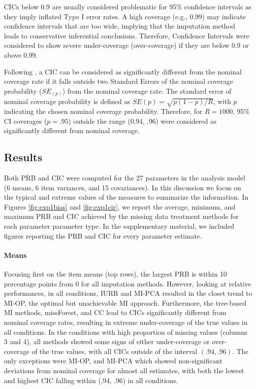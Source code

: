 	CICs below 0.9 are usually considered problematic for 95\% confidence intervals \cite[p. 52]{vanBuuren:2018} 
	as they imply inflated Type I error rates.
	A high coverage (e.g., 0.99) may indicate confidence intervals that are too wide, implying that
	the imputation method leads to conservative inferential conclusions.
	Therefore, Confidence Intervals were considered to show severe under-coverage (over-coverage) if they are 
	below 0.9 or above 0.99.

	Following \cite{burtonEtAl:2006}, a CIC can be considered as significantly different from the nominal coverage rate
	if it falls outside two Standard Errors of the nominal coverage probability ($SE_{(p)}$) from the nominal
	coverage rate.
	The standard error of nominal coverage probability is defined as $SE(p) = \sqrt{p (1-p)/R}$, with $p$ indicating the
	chosen nominal coverage probability.
	Therefore, for $R = 1000$, 95\% CI coverages ($p = .95$) outside the range (0.94, .96) were considered as significantly 
	different from nominal coverage.

\subsection{Results}
	
	Both PRB and CIC were computed for the 27 parameters in the analysis model (6 means, 6 item variances, and 15 covariances).
	In this discussion we focus on the typical and extreme values of the measures to summarize the information.
	In Figures \ref{fig:exp1bias} and \ref{fig:exp1cir}, we report the average, minimum, and maximum PRB and CIC 
	achieved by the missing data treatment methods for each parameter parameter type.
	In the supplementary material, we included figures reporting the PRB and CIC for every parameter estimate.

	\paragraph{Means} 
	Focusing first on the item means (top rows), the largest PRB is within 10 percentage points from 0 for all 
	imputation methods.
	However, looking at relative performances, in all conditions, IURR and MI-PCA resulted in the closet trend to
	MI-OP, the optimal but unachievable MI approach.
	Furthermore, the tree-based MI methods, missForest, and CC lead to CICs significantly different from nominal 
	coverage rates, resulting in extreme under-coverage of the true values in all conditions.
	In the conditions with high proportion of missing values (columns 3 and 4), all methods showed some signs of 
	either under-coverage or over-coverage of the true values, with all CICs outside of the interval $(.94, .96)$.
	The only exceptions were MI-OP, and MI-PCA which showed non-significant deviations from 
	nominal coverage for almost all estimates, with both the lowest and highest CIC falling within (.94, .96) in 
	all conditions.

